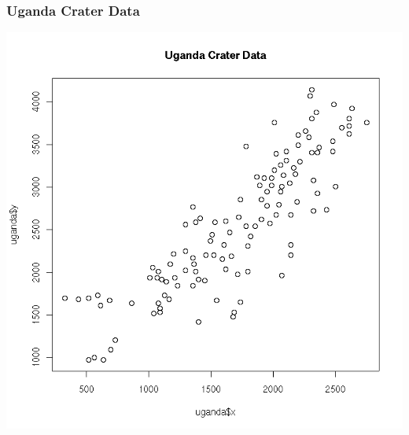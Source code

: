 \documentclass[nototal,handout]{beamer}
\begin{document}
\begin{frame}[<+->]
    \frametitle{Uganda Crater Data}
    \begin{center}
      \includegraphics[width=.65\linewidth]{uganda.png}
    \end{center}
  \end{frame}
\end{document}
